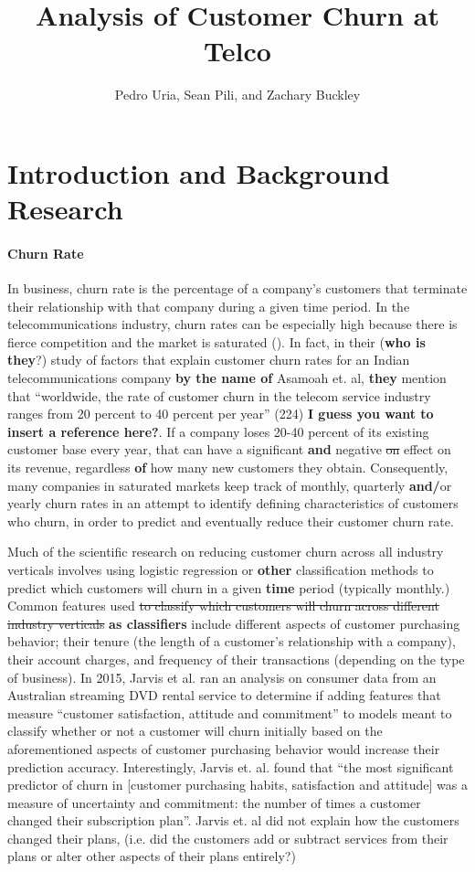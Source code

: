\documentclass[man, floatsintext]{apa6}
\title{Analysis of Customer Churn at Telco}
\author{Pedro Uria, Sean Pili, and Zachary Buckley}
\affiliation{George Washington University}
\begin{document}
\maketitle

\section{Introduction and Background Research}
\paragraph{Churn Rate}

In business, churn rate is the percentage of a company's customers that terminate their relationship with that company during a given time period. In the telecommunications industry, churn rates can be especially high because there is fierce competition and the market is saturated (\cite{Asamoah_2018}). In fact, in their (\textbf{who is they}?) study of factors that explain customer churn rates for an Indian telecommunications company \textbf{by the name of} Asamoah et. al, \textbf{they} mention that ``worldwide, the rate of customer churn in the telecom service industry ranges from 20 percent to 40 percent per year'' (224) \textbf{I guess you want to insert a reference here?}. If a company loses 20-40 percent of its existing customer base every year, that can have a significant \textbf{and} negative \sout{on} effect on its revenue, regardless \textbf{of} how many new customers they obtain.  Consequently, many companies in saturated markets keep track of monthly, quarterly \textbf{and/}or yearly churn rates in an attempt to identify defining characteristics of customers who churn, in order to predict and eventually reduce their customer churn rate.

Much of the scientific research on reducing customer churn across all industry verticals involves using logistic regression or \textbf{other} classification methods to predict which customers will churn in a given \textbf{time} period (typically monthly.) Common features used \sout{to classify which customers will churn across different industry verticals} \textbf{as classifiers} include different aspects of customer purchasing behavior; their tenure (the length of a customer's relationship with a company), their account charges,  and frequency of their transactions (depending on the type of business). In 2015, Jarvis et al. ran an analysis on consumer data from an Australian streaming DVD rental service to determine if adding features that measure ``customer satisfaction, attitude and commitment'' to models meant to classify whether or not a customer will churn initially based on the aforementioned aspects of customer purchasing behavior would increase their prediction accuracy.  Interestingly, Jarvis et. al. found that ``the most significant predictor of churn in [customer purchasing habits, satisfaction and attitude] was a measure of uncertainty and commitment: the number of times a customer changed their subscription plan''. Jarvis et. al did not explain how the customers changed their plans, (i.e. did the customers add or subtract services from their plans or alter other aspects of their plans entirely?)
\end{document}
